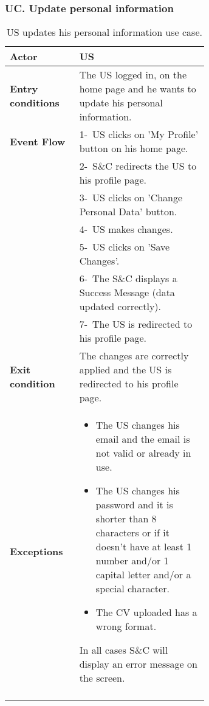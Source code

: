 \subsubsection*{UC\cuc . Update personal information}
\begin{center}
    \begin{longtable}{|l|p{0.65\linewidth}|}
        \hline
        \textbf{Actor}            & US \\
        \hline
        \textbf{Entry conditions} & The US logged in, on the home page and he wants to update his personal information.\\
        \hline
        \textbf{Event Flow}       & 1-\ US clicks on 'My Profile' button on his home page. \\
        & 2-\ S\&C redirects the US to his profile page. \\
        & 3-\ US clicks on 'Change Personal Data' button.\\
        & 4-\ US makes changes.\\
        & 5-\ US clicks on 'Save Changes'.\\
        & 6-\ The S\&C displays a Success Message (data updated correctly).\\
        & 7-\ The US is redirected to his profile page.\\
        \hline
        \textbf{Exit condition}   &  The changes are correctly applied and the US is redirected to his profile page. \\
        \hline
        \textbf{Exceptions}       & \begin{itemize}
            \item The US changes his email and the email is not valid or already in use. 
            \item The US changes his password and it is shorter than 8 characters or if it doesn’t have at least 1 number and/or 1 capital letter and/or a special character. 
            \item The CV uploaded has a wrong format. 
        \end{itemize} In all cases S\&C will display an error message on the screen.  \\
        \hline
        \caption{US updates his personal information use case.}
        \label{tab: pi_use_case}
    \end{longtable}
\end{center}

